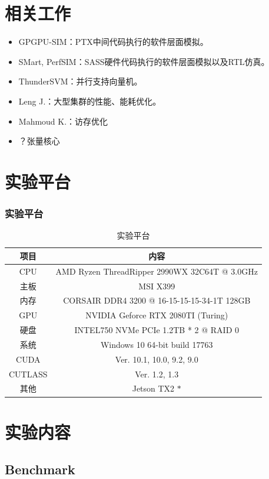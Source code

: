 \documentclass[10pt,aspectratio=169,mathserif]{beamer}
\begin{document}
	\section{相关工作}
	\begin{frame}
		\begin{itemize}
			\item GPGPU-SIM：PTX中间代码执行的软件层面模拟。
			\item SMart, PerfSIM：SASS硬件代码执行的软件层面模拟以及RTL仿真。
			\item ThunderSVM：并行支持向量机。
			\item Leng J.：大型集群的性能、能耗优化。
			\item Mahmoud K.：访存优化
			\item ？张量核心
		\end{itemize}
	\end{frame}

	\section{实验平台}
	\begin{frame}
		\frametitle{实验平台}
		\begin{table}
			\centering
			\caption{实验平台}
			\begin{tabular}{cc}
				\toprule
				项目	&	内容\\
				\midrule
				CPU		&	AMD Ryzen ThreadRipper 2990WX 32C64T @ 3.0GHz\\
				主板		&	MSI X399\\
				内存		&	CORSAIR DDR4 3200 @ 16-15-15-15-34-1T 128GB\\
				GPU		&	NVIDIA Geforce RTX 2080TI (Turing)\\
				硬盘		&	INTEL750 NVMe PCIe 1.2TB * 2 @ RAID 0\\
				系统		&	Windows 10 64-bit build 17763\\	
				CUDA	&	Ver. 10.1, 10.0, 9.2, 9.0\\
				CUTLASS & Ver. 1.2, 1.3\\
				其他		&	Jetson TX2 $ * $\\
				\bottomrule
			\end{tabular}
		\end{table}
	\end{frame}
	
	\section{实验内容}
	\subsection{Benchmark}
\end{document}
